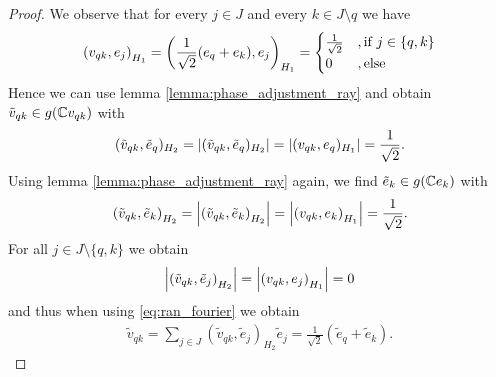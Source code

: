 \begin{proof}
	We observe that for every $j \in J$ and every $k \in J \setminus q$ we have
	\begin{align*}
		{\left ( v_{qk}, e_j \right )}_{H_1} = {\left ( \frac{1}{\sqrt{2}}(e_q + e_k), e_j \right )}_{H_1} =
		\begin{cases}
			\frac{1}{\sqrt{2}} &, \text{if } j \in \{q,k\} \\
			0 &, \text{else}
		\end{cases}
	\end{align*}
	Hence we can use lemma \ref{lemma:phase_adjustment_ray} and obtain $\tilde{v}_{qk} \in g(\mathbb{C} v_{qk})$ with
	\begin{align*}
		(\tilde{v}_{qk}, \tilde{e}_q)_{H_2} = {\left | (\tilde{v}_{qk}, \tilde{e}_q)_{H_2} \right |} = {\left | (v_{qk}, e_q)_{H_1} \right |} = \frac{1}{\sqrt{2}}.
	\end{align*}
	Using lemma \ref{lemma:phase_adjustment_ray} again, we find $\tilde{e}_{k} \in g(\mathbb{C} e_k)$ with
	\begin{align*}
		{\left ( \tilde{v}_{qk}, \tilde{e}_k \right )}_{H_2} = {\left | {\left ( \tilde{v}_{qk}, \tilde{e}_k \right )}_{H_2} \right |} = {\left | {\left ( v_{qk}, e_k \right )}_{H_1} \right |} = \frac{1}{\sqrt{2}}.
	\end{align*}
	For all $j \in J \setminus \{q, k\}$ we obtain
	\begin{align*}
		{\left | {\left ( \tilde{v}_{qk}, \tilde{e}_j \right )}_{H_2} \right |} = {\left | {\left ( v_{qk}, e_j \right )}_{H_1} \right |} = 0
	\end{align*}
	and thus when using \eqref{eq:ran_fourier} we obtain
	\begin{align*}
		\tilde{v}_{qk} = \sum_{j \in J} (\tilde{v}_{qk}, \tilde{e}_j)_{H_2} \tilde{e}_j = \frac{1}{\sqrt{2}} (\tilde{e}_q + \tilde{e}_k).
	\end{align*}
	

\end{proof}
